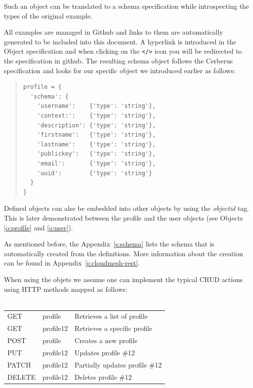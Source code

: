 \documentclass[10pt]{article}
\begin{document}
Such an object can be translated to a schema specification 
while introspecting the types of the original example. 

All examples are managed in Github and links to them are automatically
generated to be included into this document. A hyperlink is introduced
in the Object specification and when clicking on the \verb|</>| icon
you will be redirected to the specification in github. The resulting
schema object follows the Cerberus \cite{www-cerberus} specification
and looks for our specific object we introduced earlier as follows:

\begin{quote}
\begin{Verbatim}
profile = {
  'schema': {
    'username':    {'type': 'string'},
    'context:':    {'type': 'string'},
    'description': {'type': 'string'},
    'firstname':   {'type': 'string'},
    'lastname':    {'type': 'string'},
    'publickey':   {'type': 'string'},
    'email':       {'type': 'string'},
    'uuid':        {'type': 'string'}
  }
}
\end{Verbatim}
\end{quote}

Defined objects can alse be embedded into other objects by using the
{\it objectid} tag. This is later demonstrated between the profile
and the user objects (see Objects \ref{o:profile} and \ref{o:user}).


As mentioned before, the Appendix~\ref{s:schema} lists the schema
that is automatically created from the definitions. More information
about the creation can be found in Appendix~\ref{s:cloudmesh-rest}.

When using the objets we assume one can implement the typical CRUD
actions using HTTP methods mapped as follows: \\ ~\\

\begin{tabular}{lll}
GET & \/profile & Retrieves a list of profile \\
GET & \/profile\/12 & Retrieves a specific profile \\
POST & \/profile & Creates a new profile \\
PUT & \/profile\/12 & Updates profile \#12 \\
PATCH & \/profile\/12 &  Partially updates profile \#12 \\
DELETE & \/profile\/12 &  Deletes profile \#12 \\
\end{tabular}
\end{document}
